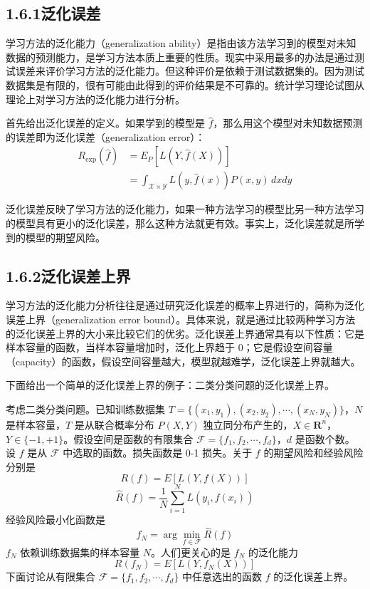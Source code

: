 \documentclass[UTF8,12pt,a4paper,fontset=fandol]{ctexart}
\begin{document}
\subsection*{1.6.1\quad 泛化误差}

学习方法的泛化能力（generalization ability）是指由该方法学习到的模型对未知数据的预测能力，是学习方法本质上重要的性质。现实中采用最多的办法是通过测试误差来评价学习方法的泛化能力。但这种评价是依赖于测试数据集的。因为测试数据集是有限的，很有可能由此得到的评价结果是不可靠的。统计学习理论试图从理论上对学习方法的泛化能力进行分析。

首先给出泛化误差的定义。如果学到的模型是 $\hat f$，那么用这个模型对未知数据预测的误差即为泛化误差（generalization error）：
\begin{equation}
\begin{aligned}
  R_{\exp}(\hat f)
  &=E_P[L(Y,\hat f(X))]\\
  &=\int_{\mathcal X\times\mathcal Y} L(y,\hat f(x))P(x,y)\,dxdy
\end{aligned}
  \tag{1.27}
\end{equation}

泛化误差反映了学习方法的泛化能力，如果一种方法学习的模型比另一种方法学习的模型具有更小的泛化误差，那么这种方法就更有效。事实上，泛化误差就是所学到的模型的期望风险。

\subsection*{1.6.2\quad 泛化误差上界}

学习方法的泛化能力分析往往是通过研究泛化误差的概率上界进行的，简称为泛化误差上界（generalization error bound）。具体来说，就是通过比较两种学习方法的泛化误差上界的大小来比较它们的优劣。泛化误差上界通常具有以下性质：它是样本容量的函数，当样本容量增加时，泛化上界趋于 0；它是假设空间容量（capacity）的函数，假设空间容量越大，模型就越难学，泛化误差上界就越大。

下面给出一个简单的泛化误差上界的例子：二类分类问题的泛化误差上界。

考虑二类分类问题。已知训练数据集 $T=\{(x_1,y_1),(x_2,y_2),\cdots,(x_N,y_N)\}$，$N$ 是样本容量，$T$ 是从联合概率分布 $P(X,Y)$ 独立同分布产生的，$X\in\mathbf R^n$，$Y\in\{-1,+1\}$。假设空间是函数的有限集合 $\mathcal F=\{f_1,f_2,\cdots,f_d\}$，$d$ 是函数个数。设 $f$ 是从 $\mathcal F$ 中选取的函数。损失函数是 0-1 损失。关于 $f$ 的期望风险和经验风险分别是
\begin{equation}
  R(f)=E[L(Y,f(X))]
  \tag{1.28}
\end{equation}
\begin{equation}
  \hat R(f)=\frac1N\sum_{i=1}^N L(y_i,f(x_i))
  \tag{1.29}
\end{equation}
经验风险最小化函数是
\begin{equation}
  f_N=\arg\min_{f\in\mathcal F}\hat R(f)
  \tag{1.30}
\end{equation}
$f_N$ 依赖训练数据集的样本容量 $N$。人们更关心的是 $f_N$ 的泛化能力
\begin{equation}
  R(f_N)=E[L(Y,f_N(X))]
  \tag{1.31}
\end{equation}
下面讨论从有限集合 $\mathcal F=\{f_1,f_2,\cdots,f_d\}$ 中任意选出的函数 $f$ 的泛化误差上界。
\end{document}
